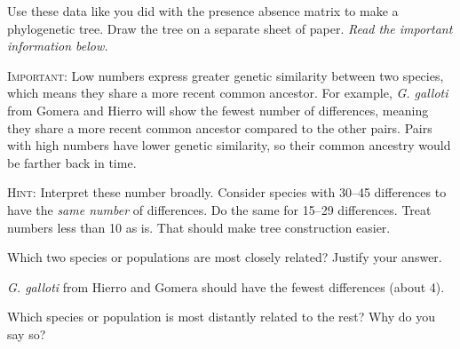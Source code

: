 \documentclass[12pt, hidelinks]{exam}
\newcommand*\AnswerBox[2]{%
    \parbox[t][#1]{0.92\textwidth}{%
    \begin{solution}#2\end{solution}}
    \vspace{\stretch{1}}
}
\begin{document}
\begin{questions}
{
}

\question \label{genetic_phylogeny}
Use these data like you did with the presence absence matrix to make a phylogenetic tree. Draw the tree on a separate sheet of paper. \emph{Read the important information below.}

\textsc{Important:} Low numbers express greater genetic similarity between two species, which means they share a more recent common ancestor. For example, \textit{G. galloti} from Gomera and Hierro will show the fewest number of differences, meaning they share a more recent common ancestor compared to the other pairs. Pairs with high numbers have lower genetic similarity, so their common ancestry would be farther back in time.

\textsc{Hint:} Interpret these number broadly. Consider species with 30–45 differences to have the \emph{same number} of differences. Do the same for 15–29 differences. Treat numbers less than 10 as is. That should make tree construction easier. 

\question
Which two species or populations are most closely related? Justify your answer. 

\AnswerBox{2\baselineskip}{\textit{G. galloti} from Hierro and Gomera should have the fewest differences (about 4).}

\question
Which species or population is most distantly related to the rest? Why do you say so? 


\end{questions}
\end{document}
